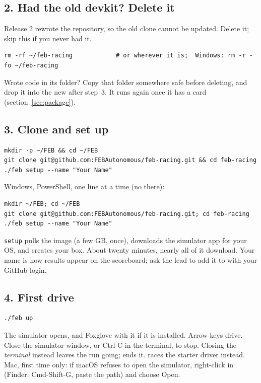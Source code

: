 \documentclass[11pt,a4paper]{article}
\begin{document}
\subsection*{2. Had the old devkit? Delete it}

Release 2 rewrote the repository, so the old clone cannot be updated. Delete it; skip this if
you never had it.

\begin{lstlisting}
rm -rf ~/feb-racing            # or wherever it is;  Windows: rm -r -fo ~/feb-racing
\end{lstlisting}

Wrote code in its  folder? Copy that folder somewhere safe before deleting, and drop
it into the new  after step~3. It runs again once it has a card (section~\ref{sec:package}).

\subsection*{3. Clone and set up}

\begin{lstlisting}
mkdir -p ~/FEB && cd ~/FEB
git clone git@github.com:FEBAutonomous/feb-racing.git && cd feb-racing
./feb setup --name "Your Name"
\end{lstlisting}

Windows, PowerShell, one line at a time (no \cmd{\&\&} there):

\begin{lstlisting}
mkdir ~/FEB; cd ~/FEB
git clone git@github.com:FEBAutonomous/feb-racing.git; cd feb-racing
./feb setup --name "Your Name"
\end{lstlisting}

\texttt{setup} pulls the image (a few GB, once), downloads the simulator app for your OS, and
creates your box. About twenty minutes, nearly all of it download. Your name is how results
appear on the scoreboard; ask the lead to add it to  with your GitHub
login.

\subsection*{4. First drive}

\begin{lstlisting}
./feb up
\end{lstlisting}

The simulator opens, and Foxglove with it if it is installed. Arrow keys drive. Close the
simulator window, or Ctrl-C in the terminal, to stop. Closing the \emph{terminal} instead leaves the run
going;  ends it.  races the starter driver instead. Mac, first time only: if macOS refuses to open the
simulator, right-click  in  (Finder:
Cmd-Shift-G, paste the path) and choose Open.
\end{document}
